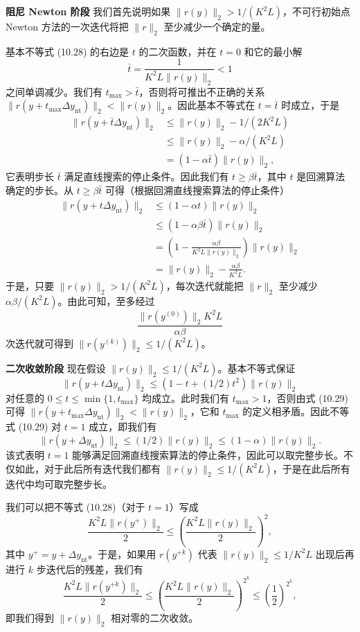 \documentclass[UTF8, 12pt, fontset=fandol, oneside]{ctexart}
\begin{document}
\noindent\textbf{阻尼 Newton 阶段}\quad
我们首先说明如果 $\|r(y)\|_2>1/(K^2L)$，不可行初始点 Newton 方法的一次迭代将把 $\|r\|_2$ 至少减少一个确定的量。

基本不等式 (10.28) 的右边是 $t$ 的二次函数，并在 $t=0$ 和它的最小解
\[
\bar{t}=\frac{1}{K^2L\|r(y)\|_2}<1
\]
之间单调减少。我们有 $t_{\max}>\bar{t}$，否则将可推出不正确的关系 $\|r(y+t_{\max}\Delta y_{\mathrm{nt}})\|_2<\|r(y)\|_2$。因此基本不等式在 $t=\bar{t}$ 时成立，于是
\[
\begin{aligned}
\|r(y+\bar{t}\Delta y_{\mathrm{nt}})\|_2
&\leq \|r(y)\|_2-1/(2K^2L)\\
&\leq \|r(y)\|_2-\alpha/(K^2L)\\
&=(1-\alpha\bar{t})\|r(y)\|_2,
\end{aligned}
\]
它表明步长 $\bar{t}$ 满足直线搜索的停止条件。因此我们有 $t\geq \beta\bar{t}$，其中 $t$ 是回溯算法确定的步长。从 $t\geq \beta\bar{t}$ 可得（根据回溯直线搜索算法的停止条件）
\[
\begin{aligned}
\|r(y+t\Delta y_{\mathrm{nt}})\|_2
&\leq (1-\alpha t)\|r(y)\|_2\\
&\leq (1-\alpha\beta\bar{t})\|r(y)\|_2\\
&=\left(1-\frac{\alpha\beta}{K^2L\|r(y)\|_2}\right)\|r(y)\|_2\\
&=\|r(y)\|_2-\frac{\alpha\beta}{K^2L}.
\end{aligned}
\]
于是，只要 $\|r(y)\|_2>1/(K^2L)$，每次迭代就能把 $\|r\|_2$ 至少减少 $\alpha\beta/(K^2L)$。由此可知，至多经过
\[
\frac{\|r(y^{(0)})\|_2K^2L}{\alpha\beta}
\]
次迭代就可得到 $\|r(y^{(k)})\|_2\leq 1/(K^2L)$。

\noindent\textbf{二次收敛阶段}\quad
现在假设 $\|r(y)\|_2\leq 1/(K^2L)$。基本不等式保证
\begin{equation}
\|r(y+t\Delta y_{\mathrm{nt}})\|_2
\leq (1-t+(1/2)t^2)\|r(y)\|_2
\tag{10.29}
\end{equation}
对任意的 $0\leq t\leq \min\{1,t_{\max}\}$ 均成立。此时我们有 $t_{\max}>1$，否则由式 (10.29) 可得 $\|r(y+t_{\max}\Delta y_{\mathrm{nt}})\|_2<\|r(y)\|_2$，它和 $t_{\max}$ 的定义相矛盾。因此不等式 (10.29) 对 $t=1$ 成立，即我们有
\[
\|r(y+\Delta y_{\mathrm{nt}})\|_2
\leq (1/2)\|r(y)\|_2
\leq (1-\alpha)\|r(y)\|_2.
\]
该式表明 $t=1$ 能够满足回溯直线搜索算法的停止条件，因此可以取完整步长。不仅如此，对于此后所有迭代我们都有 $\|r(y)\|_2\leq 1/(K^2L)$，于是在此后所有迭代中均可取完整步长。

我们可以把不等式 (10.28)（对于 $t=1$）写成
\[
\frac{K^2L\|r(y^+)\|_2}{2}
\leq
\left(\frac{K^2L\|r(y)\|_2}{2}\right)^2,
\]
其中 $y^+=y+\Delta y_{\mathrm{nt}}$。于是，如果用 $r(y^{+k})$ 代表 $\|r(y)\|_2\leq 1/K^2L$ 出现后再进行 $k$ 步迭代后的残差，我们有
\[
\frac{K^2L\|r(y^{+k})\|_2}{2}
\leq
\left(\frac{K^2L\|r(y)\|_2}{2}\right)^{2^k}
\leq
\left(\frac{1}{2}\right)^{2^k},
\]
即我们得到 $\|r(y)\|_2$ 相对零的二次收敛。
\end{document}

